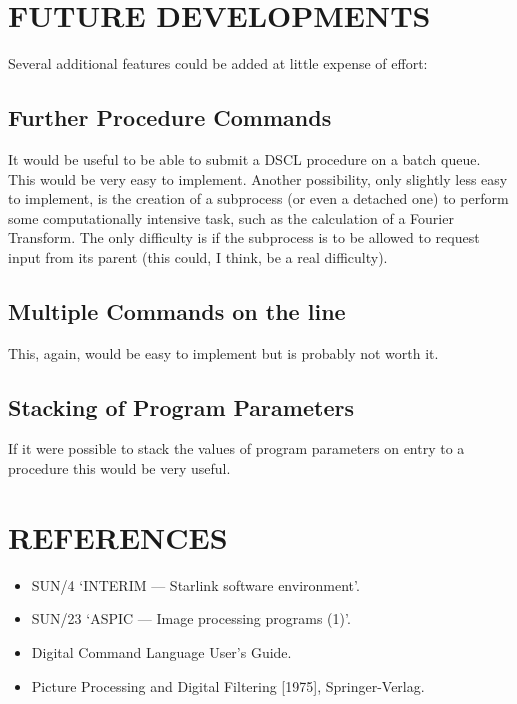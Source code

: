 \section {FUTURE DEVELOPMENTS}
Several additional features could be added at little expense of effort:
\subsection {Further Procedure Commands}
It would be useful to be able to submit a DSCL procedure on a batch queue.
This would be very easy to implement.
Another possibility, only slightly less easy to implement, is the creation of a
subprocess (or even a detached one) to perform some computationally intensive
task, such as the calculation of a Fourier Transform.
The only difficulty is if the subprocess is to be allowed to request input from
its parent (this could, I think, be a real difficulty).
\subsection {Multiple Commands on the line}
This, again, would be easy to implement but is probably not worth it.
\subsection {Stacking of Program Parameters}
If it were possible to stack the values of program parameters on entry to a
procedure this would be very useful.
\section {REFERENCES}
\begin{itemize}
\item SUN/4 `INTERIM --- Starlink software environment'.
\item SUN/23 `ASPIC --- Image processing programs (1)'.
\item Digital Command Language User's Guide.
\item 	Picture Processing and Digital Filtering [1975], Springer-Verlag.
\end{itemize}
\appendix
